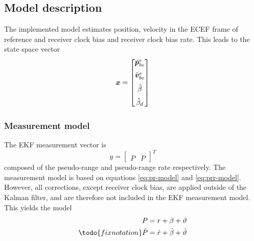 \subsection{Model description}
    The implemented model estimates position, velocity in the ECEF frame of reference and receiver clock bias and receiver clock bias rate. This leads to the state space vector
    \begin{equation}
        \bm{x} = 
        \begin{bmatrix}
            \hat{\bm{p}}^e_{be}\\[6pt]
            \hat{\bm{v}}^e_{be}\\[6pt]
            \hat{\beta}\\[6pt]
            {\hat{\beta}_d}
        \end{bmatrix}
    \end{equation}
    
    

\subsubsection{Measurement model}
    The EKF measurement vector is 
    \begin{equation}
        y = \begin{bmatrix}P & \dot{P}\end{bmatrix}^T    
        \label{eq:measurement}
    \end{equation}
    composed of the pseudo-range and pseudo-range rate respectively. The measurement model is based on equations \ref{eq:pr-model} and \ref{eq:prr-model}. However, all corrections, except receiver clock bias, are applied outside of the Kalman filter, and are therefore not included in the EKF measurement model. This yields the model
    \begin{align}
        \pr       &= \range + \beta + \vartheta\\ \todo{fix notation}
        \dot{\pr} &= \dot{\range} + \dot{\beta} + \dot{\vartheta}
    \end{align}
    
